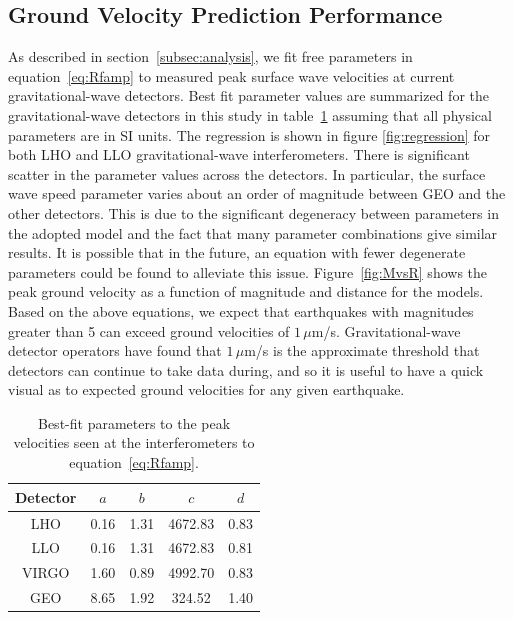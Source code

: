 \documentclass[twocolumn, aps, superscriptaddress]{revtex4}
\begin{document}
\subsection{Ground Velocity Prediction Performance}

As described in section~\ref{subsec:analysis}, we fit free parameters in equation~\ref{eq:Rfamp} to measured peak surface wave velocities at current gravitational-wave detectors. Best fit parameter values are summarized for the gravitational-wave detectors in this study in table~\ref{table:fit} assuming that all physical parameters are in SI units. The regression is shown in figure \ref{fig:regression} for both LHO and LLO gravitational-wave interferometers.
There is significant scatter in the parameter values across the detectors. In particular, the surface wave speed parameter varies about an order of magnitude between GEO and the other detectors. This is due to the significant degeneracy between parameters in the adopted model and the fact that many parameter combinations give similar results. It is possible that in the future, an equation with fewer degenerate parameters could be found to alleviate this issue.
Figure~\ref{fig:MvsR} shows the peak ground velocity as a function of magnitude and distance for the models. Based on the above equations, we expect that earthquakes with magnitudes greater than 5 can exceed ground velocities of $1\,\mu$m/s. Gravitational-wave detector operators have found that $1\,\mu$m/s is the approximate threshold that detectors can continue to take data during, and so it is useful to have a quick visual as to expected ground velocities for any given earthquake.
\begin{table}[]
\centering
\begin{tabular}{|c|c|c|c|c|}
\hline
Detector & $a$ & $b$ & $c$ & $d$ \\ \hline
LHO & 0.16 & 1.31 & 4672.83 & 0.83 \\ \hline
LLO & 0.16 & 1.31 & 4672.83 & 0.81 \\ \hline
VIRGO & 1.60 & 0.89 & 4992.70 & 0.83 \\ \hline
GEO & 8.65 & 1.92 & 324.52 & 1.40 \\ \hline
\end{tabular}
\caption{Best-fit parameters to the peak velocities seen at the interferometers to equation~\ref{eq:Rfamp}.}
\label{table:fit}
\end{table}
\end{document}
